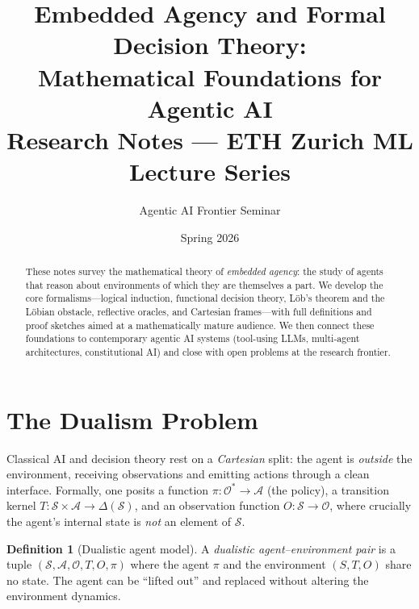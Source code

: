 \documentclass[11pt,a4paper]{article}
\title{\textbf{Embedded Agency and Formal Decision Theory:\\
Mathematical Foundations for Agentic AI}\\ [0.5em]
\large Research Notes --- ETH Zurich ML Lecture Series}
\author{Agentic AI Frontier Seminar}
\date{Spring 2026}
\theoremstyle{definition}
\newtheorem{definition}[theorem]{Definition}
\theoremstyle{remark}
\begin{document}
\maketitle

\begin{abstract}
These notes survey the mathematical theory of \emph{embedded agency}: the
study of agents that reason about environments of which they are
themselves a part.  We develop the core formalisms---logical induction,
functional decision theory, L\"ob's theorem and the L\"obian obstacle,
reflective oracles, and Cartesian frames---with full definitions and
proof sketches aimed at a mathematically mature audience.  We then
connect these foundations to contemporary agentic AI systems (tool-using
LLMs, multi-agent architectures, constitutional AI) and close with open
problems at the research frontier.
\end{abstract}

\tableofcontents
\newpage

\section{The Dualism Problem}\label{sec:dualism}

Classical AI and decision theory rest on a \emph{Cartesian} split:
the agent is \emph{outside} the environment, receiving observations and
emitting actions through a clean interface.  Formally, one posits a
function $\pi : \mathcal{O}^* \to \mathcal{A}$ (the policy), a
transition kernel $T : \mathcal{S} \times \mathcal{A} \to
\Delta(\mathcal{S})$, and an observation function $O : \mathcal{S} \to
\mathcal{O}$, where crucially the agent's internal state is \emph{not}
an element of $\mathcal{S}$.

\begin{definition}[Dualistic agent model]
A \emph{dualistic agent--environment pair} is a tuple
$(\mathcal{S}, \mathcal{A}, \mathcal{O}, T, O, \pi)$ where the
agent $\pi$ and the environment $(S, T, O)$ share no state.
The agent can be ``lifted out'' and replaced without altering
the environment dynamics.
\end{definition}
\end{document}
